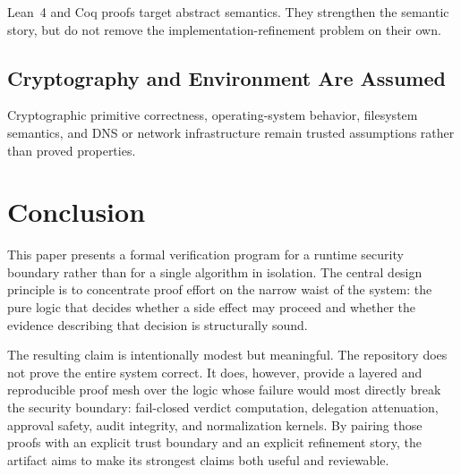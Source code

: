 \documentclass[11pt]{article}
\begin{document}
Lean~4 and Coq proofs target abstract semantics. They strengthen the semantic
story, but do not remove the implementation-refinement problem on their own.

\subsection{Cryptography and Environment Are Assumed}

Cryptographic primitive correctness, operating-system behavior, filesystem
semantics, and DNS or network infrastructure remain trusted assumptions rather
than proved properties.

\section{Conclusion}

This paper presents a formal verification program for a runtime security
boundary rather than for a single algorithm in isolation. The central design
principle is to concentrate proof effort on the narrow waist of the system: the
pure logic that decides whether a side effect may proceed and whether the
evidence describing that decision is structurally sound.

The resulting claim is intentionally modest but meaningful. The repository does
not prove the entire system correct. It does, however, provide a layered and
reproducible proof mesh over the logic whose failure would most directly break
the security boundary: fail-closed verdict computation, delegation attenuation,
approval safety, audit integrity, and normalization kernels. By pairing those
proofs with an explicit trust boundary and an explicit refinement story, the
artifact aims to make its strongest claims both useful and reviewable.



\end{document}
